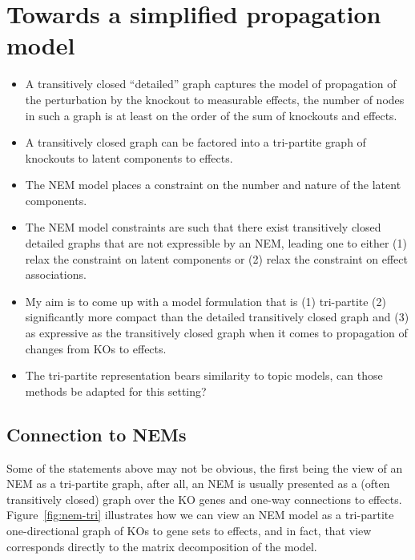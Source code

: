 \documentclass{article}
\begin{document}
\section{Towards a simplified propagation model}

\begin{itemize}
 \item A transitively closed ``detailed'' graph captures the model of propagation of the perturbation by the knockout to measurable effects, the number of nodes in such a graph is at least on the order of the sum of knockouts and effects.
 \item A transitively closed graph can be factored into a tri-partite graph of knockouts to latent components to effects.
 \item The NEM model places a constraint on the number and nature of the latent components.
 \item The NEM model constraints are such that there exist transitively closed detailed graphs that are not expressible by an NEM, leading one to either (1) relax the constraint on latent components or (2) relax the constraint on effect associations.
 \item My aim is to come up with a model formulation that is (1) tri-partite (2) significantly more compact than the detailed transitively closed graph and (3) as expressive as the transitively closed graph when it comes to propagation of changes from KOs to effects.
 \item The tri-partite representation bears similarity to topic models, can those methods be adapted for this setting?
\end{itemize}

\subsection{Connection to NEMs}

Some of the statements above may not be obvious, the first being the view of an NEM as a tri-partite graph, after all, an NEM is usually presented as a (often transitively closed) graph over the KO genes and one-way connections to effects.
Figure~\ref{fig:nem-tri} illustrates how we can view an NEM model as a tri-partite one-directional graph of KOs to gene sets to effects, and in fact, that view corresponds directly to the matrix decomposition of the model.
\end{document}
